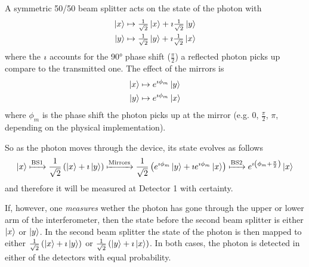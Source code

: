 A symmetric 50/50 beam splitter acts on the state of the photon with
\[
\begin{aligned}
\ket{x} &\mapsto \tfrac{1}{\sqrt{2}} \ket{x} + \imath \tfrac{1}{\sqrt{2}} \ket{y} \\
\ket{y} &\mapsto \tfrac{1}{\sqrt{2}} \ket{y} + \imath \tfrac{1}{\sqrt{2}} \ket{x}
\end{aligned}
\]
where the $\imath$ accounts for the 90° phase shift ($\frac{\pi}{2}$) a reflected photon picks up compare to the transmitted one.
The effect of the mirrors is
\[
\begin{aligned}
\ket{x} &\mapsto e^{\imath \phi_m} \ket{y}  \\
\ket{y} &\mapsto e^{\imath \phi_m} \ket{x} 
\end{aligned}
\]
where $\phi_m$ is the phase shift the photon picks up at the mirror (e.g. $0$, $\frac{\pi}{2}$, $\pi$, depending on the physical implementation).


So as the photon moves through the device, its state evolves as follows
\[
\ket{x} 
\xmapsto{\text{BS1}}
\frac{1}{\sqrt{2}}\left(\ket{x} + \imath \ket{y}\right)
\xmapsto{\text{Mirrors}}
\frac{1}{\sqrt{2}}\left(e^{\imath \phi_m} \ket{y} + \imath e^{\imath \phi_m} \ket{x}\right)
\xmapsto{\text{BS2}}
e^{\imath \left(\phi_m + \frac{\pi}{2}\right)} \ket{x}
\]
and therefore it will be measured at Detector 1 with certainty.

If, however, one \emph{measures} wether the photon has gone through the upper or lower arm of the interferometer,
then the state before the second beam splitter is either $\ket{x}$ or $\ket{y}$.
In the second beam splitter the state of the photon is then mapped to either
$\frac{1}{\sqrt{2}}\left(\ket{x} + \imath \ket{y}\right)$
or
$\frac{1}{\sqrt{2}}\left(\ket{y} + \imath \ket{x}\right)$.
In both cases, the photon is detected in either of the detectors with equal probability.


